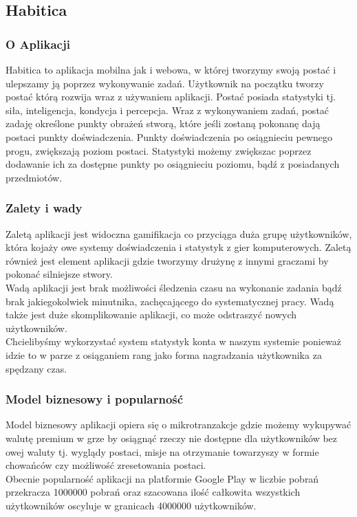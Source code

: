 \documentclass[a4paper,11pt]{report}
\begin{document}
\subsection{Habitica}
\subsubsection{O Aplikacji}
Habitica to aplikacja mobilna jak i webowa, w której tworzymy swoją postać i ulepszamy ją poprzez wykonywanie zadań. Użytkownik na początku tworzy postać którą rozwija wraz z używaniem aplikacji. Postać posiada statystyki tj. siła, inteligencja, kondycja i percepcja. Wraz z wykonywaniem zadań, postać zadaję określone punkty obrażeń stworą, które jeśli zostaną pokonanę dają postaci punkty doświadczenia. Punkty doświadczenia po osiągnieciu pewnego progu, zwiększają poziom postaci. Statystyki możemy zwiększac poprzez dodawanie ich za dostępne punkty po osiągnieciu poziomu, bądź z posiadanych przedmiotów.
\subsubsection{Zalety i wady}
Zaletą aplikacji jest widoczna gamifikacja co przyciąga duża grupę użytkowników, która kojaży owe systemy doświadczenia i statystyk z gier komputerowych. Zaletą również jest element aplikacji gdzie tworzymy drużynę z innymi graczami by pokonać silniejsze stwory.\vspace{0,5cm}\\Wadą aplikacji jest brak możliwości śledzenia czasu na wykonanie zadania bądź brak jakiegokolwiek minutnika, zachęcającego do systematycznej pracy. Wadą także jest duże skomplikowanie aplikacji, co może odstraszyć nowych użytkowników.\vspace{0,5cm}\\
Chcielibyśmy wykorzystać system statystyk konta w naszym systemie ponieważ idzie to w parze z osiąganiem rang jako forma nagradzania użytkownika za spędzany czas.
\subsubsection{Model biznesowy i popularność}
Model biznesowy aplikacji opiera się o mikrotranzakcje gdzie możemy wykupywać walutę premium w grze by osiągnąć rzeczy nie dostępne dla użytkowników bez owej waluty tj. wyglądy postaci, misje na otrzymanie towarzyszy w formie chowańców czy możliwość zresetowania postaci.\vspace{0,5cm}\\
Obecnie popularność aplikacji na platformie Google Play w liczbie pobrań przekracza 1000000 pobrań oraz szacowana ilość całkowita wszystkich użytkowników oscyluje w granicach 4000000 użytkowników.
\end{document}
